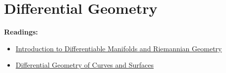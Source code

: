 \part{Differential Geometry}
\textbf{Readings:}
\begin{itemize}
\item \href{https://aetemad.iut.ac.ir/sites/aetemad.iut.ac.ir/files/files_course/william_m._boothby_an_introduction_to_differentibookfi.org_.pdf}{Introduction to Differentiable Manifolds and Riemannian Geometry}
\item \href{http://www2.ing.unipi.it/griff/files/dC.pdf}{Differential Geometry of Curves and Surfaces}
\end{itemize}
